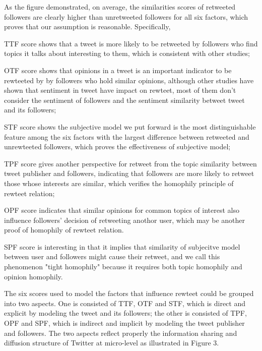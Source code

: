\documentclass{acm_proc_article-sp}
\begin{document}
As the figure demonstrated, on average, the similarities scores of retweeted followers are clearly higher than unretweeted followers for all six factors, which proves that our assumption is reasonable. Specifically,
\begin{itemize*}
\item TTF score shows that a tweet is more likely to be retweeted by followers who find topics it talks about interesting to them, which is consistent with other studies\cite{conf/icwsm/MacskassyM11, conf/wsdm/FengW13};
\item OTF score shows that opinions in a tweet is an important indicator to be rewteeted by by followers who hold similar opinions, although other studies\cite{conf/icwsm/PfitznerGS12,2011:NaveedGKC} have shown that sentiment in tweet have impact on rewteet, most of them don't consider the sentiment of followers and the sentiment similarity betweet tweet and its followers;
\item STF score shows the subjective model we put forward is the most distinguishable feature among the six factors with the largest difference between retweeted and unrewteeted followers, which proves the effectiveness of subjective model;
\item TPF score gives another perspective for retweet from the topic similarity between tweet publisher and followers, indicating that followers are more likely to retweet those whose interests are similar, which verifies the homophily principle of rewteet relation;
\item OPF score indicates that similar opinions for common topics of interest also influence followers' decision of retweeting anothor user, which may be another proof of homophily of rewteet relation.
\item SPF score is interesting in that it implies that similarity of subjecitve model between user and followers might cause their retweet, and we call this phenomenon "tight homophily" because it requires both topic homophily and opinion homophily.
\end{itemize*} 
The six scores used to model the factors that influence rewteet could be grouped into two aspects. 
One is consisted of TTF, OTF and STF, which is direct and explicit by modeling the tweet and its followers;
the other is consisted of TPF, OPF and SPF, which is indirect and implicit by modeling the tweet publisher and followers.
The two aspects reflect properly the information sharing and diffusion structure of Twitter at micro-level as illustrated in Figure 3.
\end{document}
